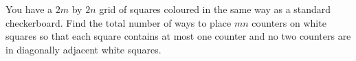 You have a $2m$ by $2n$ grid of squares coloured in the same way as a standard checkerboard. Find the total number of ways to place $mn$ counters on white squares so that each square contains at most one counter and no two counters are in diagonally adjacent white squares.